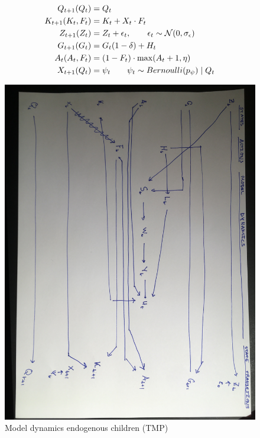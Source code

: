 \begin{align}
    Q_{t+1}(Q_t) &= Q_t \\
    K_{t+1}(K_t, F_t)  &= K_{t} + X_t \cdot F_{t} \\
    Z_{t+1}(Z_t) &= Z_t + \epsilon_t, \qquad \epsilon_t \sim \mathcal{N}(0, \sigma_\epsilon) \\
    G_{t+1}(G_t) &= G_t(1 - \delta) + H_t \\
    A_t(A_t, F_t) &= (1 - F_t) \cdot \max(A_t + 1, \eta)  \\
    X_{t+1}(Q_t) &= \psi_t \qquad \psi_t \sim Bernoulli(p_\psi) \mid Q_t
\end{align}

\begin{figure}
    \centering
    \includegraphics[scale=0.1]{figures/modeldynamics_tmp_endogenous.JPG}
    \caption{Model dynamics endogenous children (TMP) }
    \label{fig:tmp_modeldynamics_endogenous}
\end{figure}